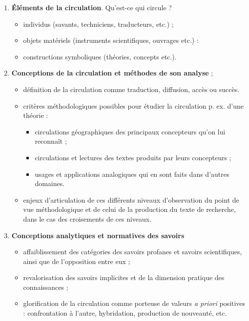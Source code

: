 \begin{enumerate}
    \item \textbf{Éléments de la circulation}. Qu'est-ce qui circule ? 
    \begin{itemize}
        \item individus (savants, techniciens, traducteurs, etc.) ;
        \item objets matériels (instruments scientifiques, ouvrages etc.) :
        \item constructions symboliques (théories, concepts etc.).
    \end{itemize}  
    \item \textbf{Conceptions de la circulation et méthodes de son analyse} ;
    \begin{itemize}
        \item définition de la circulation comme \og{}traduction\fg{}, \og{}diffusion\fg{}, \og{}accès\fg{} ou \og{}succès\fg{}.
        \item critères méthodologiques possibles pour étudier la circulation p. ex. d'une théorie : 
        \begin{itemize}
            \item circulations géographiques des principaux concepteurs qu'on lui reconnaît ;
            \item circulations et lectures des textes produits par leurs concepteurs ;
            \item usages et applications analogiques qui en sont faits dans d'autres domaines.
        \end{itemize} 
        \item enjeux d'articulation de ces différents niveaux d'observation du point de vue méthodologique et de celui de la production du texte de recherche, dans le cas des croisements de ces niveaux.
    \end{itemize}
    \item \textbf{Conceptions analytiques et normatives des savoirs}
    \begin{itemize}
        \item affaiblissement des catégories des \og{}savoirs profanes\fg{} et \og{}savoirs scientifiques\fg{}, ainsi que de l'opposition entre eux ;
        \item revalorisation des savoirs implicites et de la dimension pratique des connaissances ;
        \item glorification de la circulation comme porteuse de valeurs \textit{a priori} positives : confrontation à l'autre, hybridation, production de nouveauté, etc.
    \end{itemize}
\end{enumerate}

